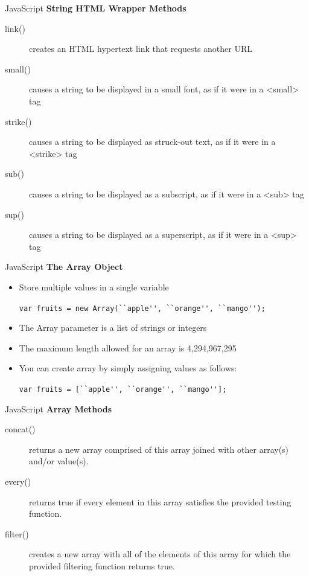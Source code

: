 \documentclass[14pt]{beamer}
\begin{document}
\begin{frame}{JavaScript}
\textbf{String HTML Wrapper Methods}
\small
\begin{description}
 \item [link()] creates an HTML hypertext link that requests another URL
 \item [small()] causes a string to be displayed in a small font, as if it were in a <small> tag
 \item [strike()] causes a string to be displayed as struck-out text, as if it were in a <strike> tag
 \item [sub()] causes a string to be displayed as a subscript, as if it were in a <sub> tag
 \item [sup()] causes a string to be displayed as a superscript, as if it were in a <sup> tag
\end{description}
\end{frame}

\begin{frame}{JavaScript}
\textbf{The Array Object}
\begin{itemize}
 \item Store multiple values in a single variable
 
 \lstinline!var fruits = new Array(``apple'', ``orange'', ``mango'');!
 \item The Array parameter is a list of strings or integers
 \item The maximum length allowed for an array is 4,294,967,295
 \item You can create array by simply assigning values as follows:
 
 \lstinline!var fruits = [``apple'', ``orange'', ``mango''];!
\end{itemize}
\end{frame}

\begin{frame}{JavaScript}
\textbf{Array Methods}
\begin{description}
 \item [concat()] returns a new array comprised of this array joined with other array(s) and/or value(s).
 \item [every()] returns true if every element in this array satisfies the provided testing function.
 \item [filter()] creates a new array with all of the elements of this array for which the provided filtering function returns true.
\end{description}
\end{frame}
\end{document}
